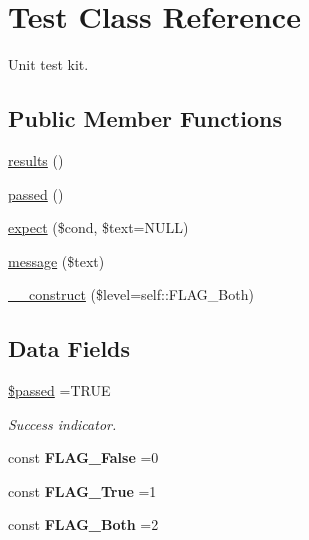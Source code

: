 \hypertarget{class_test}{}\section{Test Class Reference}
\label{class_test}


Unit test kit.  


\subsection*{Public Member Functions}
\begin{DoxyCompactItemize}
\item 
\hyperlink{class_test_a81532ad36ede4bfc6cd5e69a321f3df4}{results} ()
\item 
\hyperlink{class_test_a846b7d46e6d54e369e91f13b8326ec50}{passed} ()
\item 
\hyperlink{class_test_a82ce39187ec69f28ce3ad0b971858c32}{expect} (\$cond, \$text=N\+U\+LL)
\item 
\hyperlink{class_test_a6d386dc62867e5f7426c28c22ca913c6}{message} (\$text)
\item 
\hyperlink{class_test_a54d3be59961cf484bfd4cb83ddabab74}{\+\_\+\+\_\+construct} (\$level=self\+::\+F\+L\+A\+G\+\_\+\+Both)
\end{DoxyCompactItemize}
\subsection*{Data Fields}
\begin{DoxyCompactItemize}
\item 
\hypertarget{class_test_a36f815b75b2e9a2b312e4c61daf87e9a}{}\label{class_test_a36f815b75b2e9a2b312e4c61daf87e9a} 
\hyperlink{class_test_a36f815b75b2e9a2b312e4c61daf87e9a}{\$passed} =T\+R\+UE
\begin{DoxyCompactList}\small\item\em Success indicator. \end{DoxyCompactList}\end{DoxyCompactItemize}
{\bf }\par
\begin{DoxyCompactItemize}
\item 
\hypertarget{class_test_a622dd069e85c588302b34a8f74b67f62}{}\label{class_test_a622dd069e85c588302b34a8f74b67f62} 
const {\bfseries F\+L\+A\+G\+\_\+\+False} =0
\item 
\hypertarget{class_test_a97e6e2fe98188272b4bff029c2c60964}{}\label{class_test_a97e6e2fe98188272b4bff029c2c60964} 
const {\bfseries F\+L\+A\+G\+\_\+\+True} =1
\item 
\hypertarget{class_test_a0639e68a4d3583d8257f2794dcdc259f}{}\label{class_test_a0639e68a4d3583d8257f2794dcdc259f} 
const {\bfseries F\+L\+A\+G\+\_\+\+Both} =2
\end{DoxyCompactItemize}

